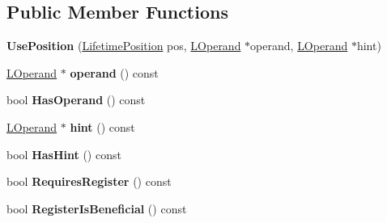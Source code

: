 \subsection*{Public Member Functions}
\begin{DoxyCompactItemize}
\item 
{\bfseries Use\+Position} (\hyperlink{classv8_1_1internal_1_1_lifetime_position}{Lifetime\+Position} pos, \hyperlink{classv8_1_1internal_1_1_l_operand}{L\+Operand} $\ast$operand, \hyperlink{classv8_1_1internal_1_1_l_operand}{L\+Operand} $\ast$hint)\hypertarget{classv8_1_1internal_1_1_use_position_af3d4a5a3dcf445235f9e1854f02ca8cc}{}\label{classv8_1_1internal_1_1_use_position_af3d4a5a3dcf445235f9e1854f02ca8cc}

\item 
\hyperlink{classv8_1_1internal_1_1_l_operand}{L\+Operand} $\ast$ {\bfseries operand} () const \hypertarget{classv8_1_1internal_1_1_use_position_a0190d80a08f786552122d126defa46e2}{}\label{classv8_1_1internal_1_1_use_position_a0190d80a08f786552122d126defa46e2}

\item 
bool {\bfseries Has\+Operand} () const \hypertarget{classv8_1_1internal_1_1_use_position_a59dcf5faa98834b835d9ea27f7be61de}{}\label{classv8_1_1internal_1_1_use_position_a59dcf5faa98834b835d9ea27f7be61de}

\item 
\hyperlink{classv8_1_1internal_1_1_l_operand}{L\+Operand} $\ast$ {\bfseries hint} () const \hypertarget{classv8_1_1internal_1_1_use_position_aa52bbe57f7c73b31a0915235d8598401}{}\label{classv8_1_1internal_1_1_use_position_aa52bbe57f7c73b31a0915235d8598401}

\item 
bool {\bfseries Has\+Hint} () const \hypertarget{classv8_1_1internal_1_1_use_position_a43b0fcf35ca6c64e66f58d3dc742cd02}{}\label{classv8_1_1internal_1_1_use_position_a43b0fcf35ca6c64e66f58d3dc742cd02}

\item 
bool {\bfseries Requires\+Register} () const \hypertarget{classv8_1_1internal_1_1_use_position_a725000aed2d14de75acfab72ef8ea0c4}{}\label{classv8_1_1internal_1_1_use_position_a725000aed2d14de75acfab72ef8ea0c4}

\item 
bool {\bfseries Register\+Is\+Beneficial} () const \hypertarget{classv8_1_1internal_1_1_use_position_afe6202b7a7aedcac72cbab18d34ae1c6}{}\label{classv8_1_1internal_1_1_use_position_afe6202b7a7aedcac72cbab18d34ae1c6}


\end{DoxyCompactItemize}
